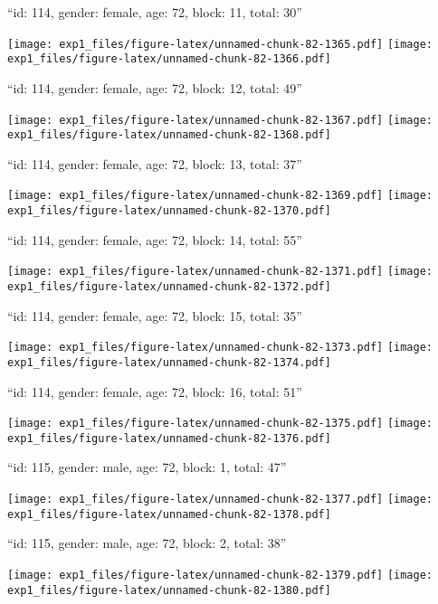 \documentclass[11pt,,]{article}
\begin{document}
\newpage
[1] 

``id: 114, gender: female, age: 72, block: 11, total: 30''

\texttt{[image: exp1\_files/figure-latex/unnamed-chunk-82-1365.pdf]}
\texttt{[image: exp1\_files/figure-latex/unnamed-chunk-82-1366.pdf]}

\newpage
[1] 

``id: 114, gender: female, age: 72, block: 12, total: 49''

\texttt{[image: exp1\_files/figure-latex/unnamed-chunk-82-1367.pdf]}
\texttt{[image: exp1\_files/figure-latex/unnamed-chunk-82-1368.pdf]}

\newpage
[1] 

``id: 114, gender: female, age: 72, block: 13, total: 37''

\texttt{[image: exp1\_files/figure-latex/unnamed-chunk-82-1369.pdf]}
\texttt{[image: exp1\_files/figure-latex/unnamed-chunk-82-1370.pdf]}

\newpage
[1] 

``id: 114, gender: female, age: 72, block: 14, total: 55''

\texttt{[image: exp1\_files/figure-latex/unnamed-chunk-82-1371.pdf]}
\texttt{[image: exp1\_files/figure-latex/unnamed-chunk-82-1372.pdf]}

\newpage
[1] 

``id: 114, gender: female, age: 72, block: 15, total: 35''

\texttt{[image: exp1\_files/figure-latex/unnamed-chunk-82-1373.pdf]}
\texttt{[image: exp1\_files/figure-latex/unnamed-chunk-82-1374.pdf]}

\newpage
[1] 

``id: 114, gender: female, age: 72, block: 16, total: 51''

\texttt{[image: exp1\_files/figure-latex/unnamed-chunk-82-1375.pdf]}
\texttt{[image: exp1\_files/figure-latex/unnamed-chunk-82-1376.pdf]}

\newpage
[1] 

``id: 115, gender: male, age: 72, block: 1, total: 47''

\texttt{[image: exp1\_files/figure-latex/unnamed-chunk-82-1377.pdf]}
\texttt{[image: exp1\_files/figure-latex/unnamed-chunk-82-1378.pdf]}

\newpage
[1] 

``id: 115, gender: male, age: 72, block: 2, total: 38''

\texttt{[image: exp1\_files/figure-latex/unnamed-chunk-82-1379.pdf]}
\texttt{[image: exp1\_files/figure-latex/unnamed-chunk-82-1380.pdf]}
\end{document}

